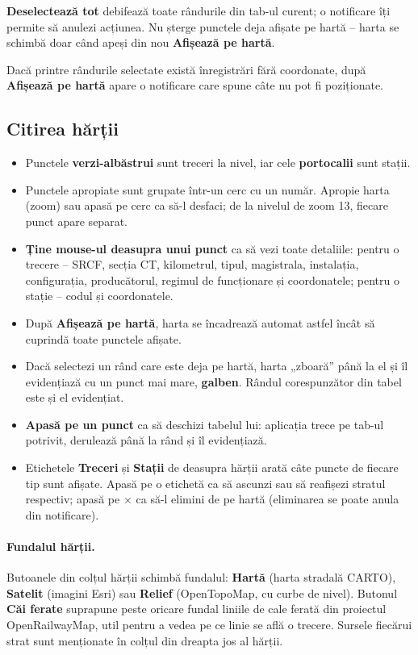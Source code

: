 \documentclass[11pt,a4paper]{article}
\newcommand{\ui}[1]{\textsf{\textbf{#1}}}
\begin{document}
\ui{Deselectează tot} debifează toate rândurile din tab-ul curent; o
notificare îți permite să anulezi acțiunea. Nu șterge punctele deja afișate
pe hartă -- harta se schimbă doar când apeși din nou \ui{Afișează pe hartă}.

Dacă printre rândurile selectate există înregistrări fără coordonate, după
\ui{Afișează pe hartă} apare o notificare care spune câte nu pot fi
poziționate.

\subsection{Citirea hărții}

\begin{itemize}
  \item Punctele \textcolor{cfrteal}{\textbf{verzi-albăstrui}} sunt treceri la
        nivel, iar cele \textcolor{cforange}{\textbf{portocalii}} sunt stații.
  \item Punctele apropiate sunt grupate într-un cerc cu un număr. Apropie
        harta (zoom) sau apasă pe cerc ca să-l desfaci; de la nivelul de zoom
        13, fiecare punct apare separat.
  \item \textbf{Ține mouse-ul deasupra unui punct} ca să vezi toate detaliile:
        pentru o trecere -- SRCF, secția CT, kilometrul, tipul, magistrala,
        instalația, configurația, producătorul, regimul de funcționare și
        coordonatele; pentru o stație -- codul și coordonatele.
  \item După \ui{Afișează pe hartă}, harta se încadrează automat astfel încât să cuprindă
        toate punctele afișate.
  \item Dacă selectezi un rând care este deja pe hartă, harta „zboară” până la
        el și îl evidențiază cu un punct mai mare, \textcolor{cframber}{\textbf{galben}}.
        Rândul corespunzător din tabel este și el evidențiat.
  \item \textbf{Apasă pe un punct} ca să deschizi tabelul lui: aplicația
        trece pe tab-ul potrivit, derulează până la rând și îl evidențiază.
  \item Etichetele \ui{Treceri} și \ui{Stații} de deasupra hărții arată câte
        puncte de fiecare tip sunt afișate. Apasă pe o etichetă ca să ascunzi
        sau să reafișezi stratul respectiv; apasă pe \ui{$\times$} ca să-l
        elimini de pe hartă (eliminarea se poate anula din notificare).
\end{itemize}

\paragraph{Fundalul hărții.} Butoanele din colțul hărții schimbă fundalul:
\ui{Hartă} (harta stradală CARTO), \ui{Satelit} (imagini Esri) sau
\ui{Relief} (OpenTopoMap, cu curbe de nivel). Butonul \ui{Căi ferate}
suprapune peste oricare fundal liniile de cale ferată din proiectul
OpenRailwayMap, util pentru a vedea pe ce linie se află o trecere. Sursele
fiecărui strat sunt menționate în colțul din dreapta jos al hărții.
\end{document}

